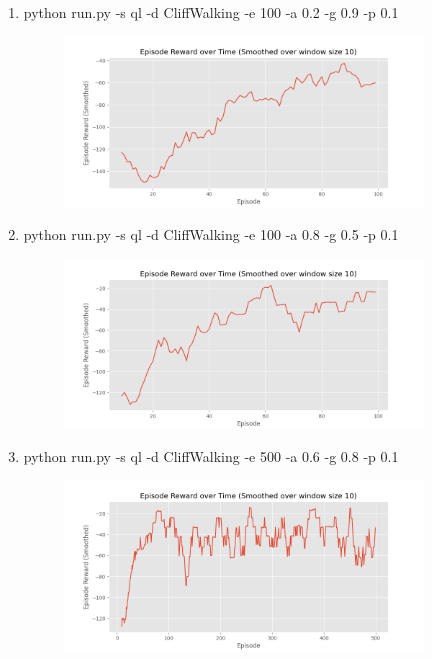 \documentclass[a4paper]{article}
\theoremstyle{definition}
\newenvironment{soln}{
    \leavevmode\color{blue}\ignorespaces
}{}
\begin{document}
\pagebreak
\begin{enumerate}
	\item  python run.py -s ql -d CliffWalking -e 100 -a 0.2 -g 0.9 -p 0.1
	      \begin{soln}
		      \begin{figure}[H]
			      \centering
			      \includegraphics[width=0.9\textwidth]{img/ql_1.png}
		      \end{figure}
	      \end{soln}
	\item  python run.py -s ql -d CliffWalking -e 100 -a 0.8 -g 0.5 -p 0.1
	      \begin{soln}
		      \begin{figure}[H]
			      \centering
			      \includegraphics[width=0.9\textwidth]{img/ql_2.png}
		      \end{figure}
	      \end{soln}
	\item  python run.py -s ql -d CliffWalking -e 500 -a 0.6 -g 0.8 -p 0.1
	      \begin{soln}
		      \begin{figure}[H]
			      \centering
			      \includegraphics[width=0.9\textwidth]{img/ql_3.png}
		      \end{figure}
	      \end{soln}
\end{enumerate}
\end{document}
